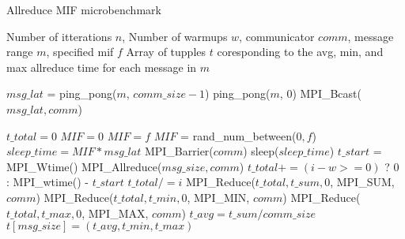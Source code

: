 \begin{algorithm}
  \caption{Allreduce MIF microbenchmark}
  \label{alg:mif_microbmark}
  \begin{algorithmic}[1]
    \Require Number of itterations $n$, Number of warmups $w$, communicator $comm$, message range $m$, specified mif $f$
    \Ensure Array of tupples $t$ coresponding to the avg, min, and max allreduce time for each message in $m$
    
            \State $msg\_lat$ = ping\_pong($m$, $comm\_size - 1$)
            \State ping\_pong($m$, 0)
        \EndIf
        \State MPI\_Bcast($msg\_lat, comm$) 
        
        \State $t\_total = 0$
                \State $MIF = 0$ 
                \State $MIF = f$
            \Else
                \State $MIF$ = rand\_num\_between($0, f$) 
            \EndIf
            \State $sleep\_time = MIF * msg\_lat$
            \State MPI\_Barrier($comm$)
            \State sleep($sleep\_time$) 
            \State $t\_start$ = MPI\_Wtime()
            \State MPI\_Allreduce($msg\_size, comm$)
            \State $t\_total += (i-w >= 0)$ ? 0 : MPI\_wtime() - $t\_start$
        \EndFor
        \State $t\_total /= i$
        \State MPI\_Reduce($t\_total, t\_sum, 0$, MPI\_SUM, $comm$)
        \State MPI\_Reduce($t\_total, t\_min, 0$, MPI\_MIN, $comm$)
        \State MPI\_Reduce($t\_total, t\_max, 0$, MPI\_MAX, $comm$)
        \State $t\_avg = t\_sum / comm\_size$
        \State $t[msg\_size] = (t\_avg, t\_min, t\_max)$
    \EndFor
  \end{algorithmic}
\end{algorithm}